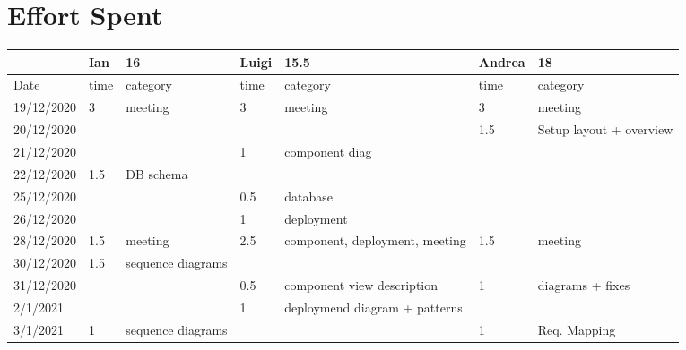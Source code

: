 
\section{Effort Spent}
\begin{table}[H]
    \begin{tabular}{|l|l|p{2.5cm}|l|p{2.5cm}|l|p{2.5cm}|}
        \hline
        & Ian   & 16                     & Luigi & 15.5                           & Andrea & 18                      \\
        \hline
        Date       & time  & category               & time  & category                       & time   & category               \\
        \hline
        19/12/2020 & 3     & meeting                & 3     & meeting                        & 3      & meeting                 \\
        20/12/2020 &       &                        &       &                                & 1.5    & Setup layout + overview \\
        21/12/2020 &       &                        & 1     & component diag                 &        &                         \\
        22/12/2020 & 1.5   & DB schema              &       &                                &        &                         \\
        25/12/2020 &       &                        & 0.5   & database                       &        &                         \\
        26/12/2020 &       &                        & 1     & deployment                     &        &                         \\
        28/12/2020 & 1.5   & meeting                & 2.5   & component, deployment, meeting & 1.5    & meeting                 \\
        30/12/2020 & 1.5   & sequence diagrams      &       &                                &        &                         \\
        31/12/2020 &       &                        & 0.5   & component view description     & 1      & diagrams + fixes        \\
        2/1/2021   &       &                        & 1     & deploymend diagram + patterns  &        &                         \\
        3/1/2021   & 1     & sequence diagrams      &       &                                & 1      & Req. Mapping            \\

\end{tabular}
\end{table}

